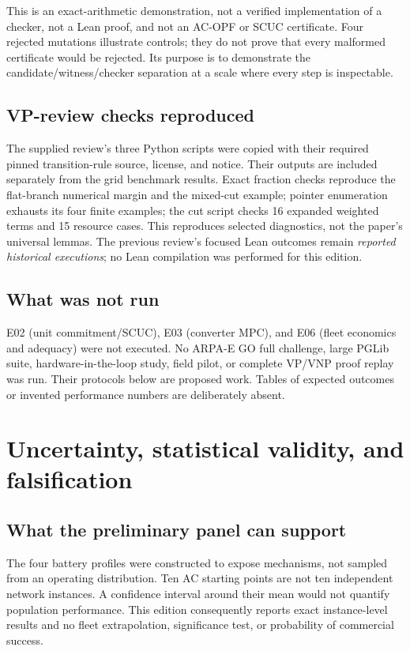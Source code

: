\documentclass[11pt,letterpaper]{article}
\begin{document}
This is an exact-arithmetic demonstration, not a verified implementation of a checker, not a Lean proof, and not an AC-OPF or SCUC certificate. Four rejected mutations illustrate controls; they do not prove that every malformed certificate would be rejected. Its purpose is to demonstrate the candidate/witness/checker separation at a scale where every step is inspectable.

\subsection{VP-review checks reproduced}
The supplied review's three Python scripts were copied with their required pinned transition-rule source, license, and notice. Their outputs are included separately from the grid benchmark results. Exact fraction checks reproduce the flat-branch numerical margin and the mixed-cut example; pointer enumeration exhausts its four finite examples; the cut script checks 16 expanded weighted terms and 15 resource cases. This reproduces selected diagnostics, not the paper's universal lemmas. The previous review's focused Lean outcomes remain \emph{reported historical executions}; no Lean compilation was performed for this edition.

\subsection{What was not run}
E02 (unit commitment/SCUC), E03 (converter MPC), and E06 (fleet economics and adequacy) were not executed. No ARPA-E GO full challenge, large PGLib suite, hardware-in-the-loop study, field pilot, or complete VP/VNP proof replay was run. Their protocols below are proposed work. Tables of expected outcomes or invented performance numbers are deliberately absent.

\section{Uncertainty, statistical validity, and falsification}
\label{sec:uncertainty}
\subsection{What the preliminary panel can support}
The four battery profiles were constructed to expose mechanisms, not sampled from an operating distribution. Ten AC starting points are not ten independent network instances. A confidence interval around their mean would not quantify population performance. This edition consequently reports exact instance-level results and no fleet extrapolation, significance test, or probability of commercial success.
\end{document}
